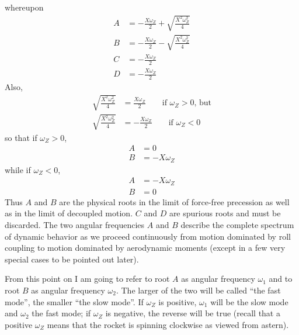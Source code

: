 whereupon
\begin{align*}
A &= -\frac{X\omega_Z}{2} + \sqrt{\frac{X^2\omega_Z^2}{4}}\\
B &= -\frac{X\omega_Z}{2} - \sqrt{\frac{X^2\omega_Z^2}{4}}\\
C &= -\frac{X\omega_Z}{2}\\
D &= -\frac{X\omega_Z}{2}
\end{align*}
Also,
\begin{align*}
\sqrt{\frac{X^2\omega_Z^2}{4}} &= \frac{X\omega_Z}{2}
  \qquad \text{if } \omega_Z > 0\text{, but}\\
\sqrt{\frac{X^2\omega_Z^2}{4}} &= -\frac{X\omega_Z}{2}
  \qquad \text{if } \omega_Z < 0
\end{align*}
so that if $\omega_Z > 0$,
\begin{align*}
A &= 0\\
B &= -X\omega_Z
\end{align*}
while if $\omega_Z < 0$,
\begin{align*}
A &= -X\omega_Z\\
B &= 0
\end{align*}
Thus $A$ and $B$ are the physical roots in the limit of force-free precession
as well as in the limit of decoupled motion. $C$ and $D$ are spurious roots
and must be discarded. The two angular frequencies $A$ and $B$ describe the
complete spectrum of dynamic behavior as we proceed continuously from motion
dominated by roll coupling to motion dominated by aerodynamic moments (except
in a few very special cases to be pointed out later).

From this point on I am going to refer to root $A$ as angular frequency
$\omega_1$ and to root $B$ as angular frequency $\omega_2$. The larger of the
two will be called ``the fast mode'', the smaller ``the slow mode''. If
$\omega_Z$ is positive, $\omega_1$ will be the slow mode and $\omega_2$ the
fast mode; if $\omega_Z$ is negative, the reverse will be true (recall that a
positive $\omega_Z$ means that the rocket is spinning clockwise as viewed from
astern).

